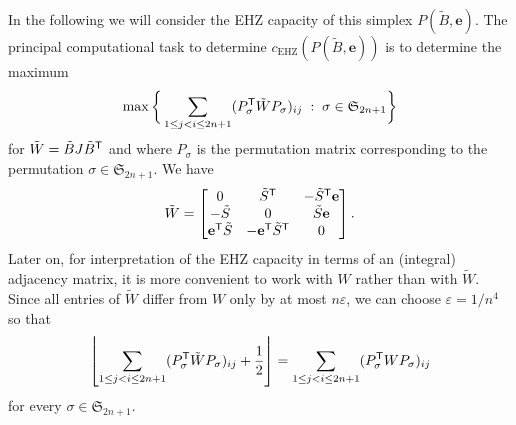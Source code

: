 \documentclass{amsart}
\newcommand{\cEHZ}{c_{\mathrm{EHZ}}}
\newcommand{\permS}{\mathfrak{S}}
\begin{document}
In the following we will consider the EHZ capacity of this simplex
$P(\tilde{B},\mathbf{e})$. The principal computational task to
determine $\cEHZ(P(\tilde{B},\mathbf{e}))$ is to determine the maximum
\begin{equation}
   \label{eqn:simplex} 
  \max\bigg\{\sum_{1 \leq j < i \leq 2n+1} (P_\sigma^{\sf T} \tilde{W}  P_\sigma )_{ij}
   \; : \; \sigma \in \permS_{2n+1} \bigg\}
\end{equation}
for $\tilde{W} = \tilde{B} J \tilde{B}^{\sf T}$ and where $P_{\sigma}$
is the permutation matrix corresponding to the permutation
$\sigma \in \permS_{2n+1}$.  We have
\[
  \tilde{W} =
  \begin{bmatrix}
    0 & \tilde{S}^{\sf T} &  -\tilde{S}^{\sf T}\textbf{e}\\
    -\tilde{S} & 0 & \tilde{S}\textbf{e}\\
 \textbf{e}^{\sf T}\tilde{S} &-\textbf{e}^{\sf T}\tilde{S}^{\sf T} & 0\\
  \end{bmatrix}.
\]
Later on, for interpretation of the EHZ capacity in terms of an (integral) adjacency matrix, 
it is more convenient to work with $W$ rather than with $\tilde{W}$.
Since all entries of $\tilde{W}$ differ from $W$ only
by at most $n \varepsilon$, we can choose $\varepsilon = 1/n^4$ so that
\[
  \left\lfloor \sum_{1 \leq j < i \leq 2n+1} (P_\sigma^{\sf T}
    \tilde{W}  P_\sigma )_{ij} + \frac{1}{2} \right\rfloor =
  \sum_{1 \leq j < i \leq 2n+1} (P_\sigma^{\sf T}
    W  P_\sigma )_{ij}
  \]
for every $\sigma \in \permS_{2n+1}$.
\end{document}
